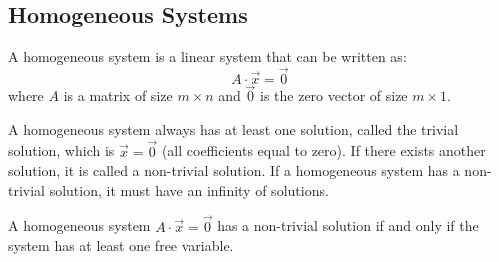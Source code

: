 \subsection{Homogeneous Systems}
\begin{definition}
    A homogeneous system is a linear system that can be written as:
    \[
        A \cdot \vec{x} = \vec{0}
    \]
    where $A$ is a matrix of size $m \times n$ and $\vec{0}$ is the zero vector of size $m \times 1$.
\end{definition}
A homogeneous system always has at least one solution, called the trivial solution, which is $\vec{x} = \vec{0}$ (all coefficients equal to zero). If there exists another solution, it is called a non-trivial solution. If a homogeneous system has a non-trivial solution, it must have an infinity of solutions.
\begin{theorem}
    A homogeneous system $A \cdot \vec{x} = \vec{0}$ has a non-trivial solution if and only if the system has at least one free variable.
\end{theorem}

